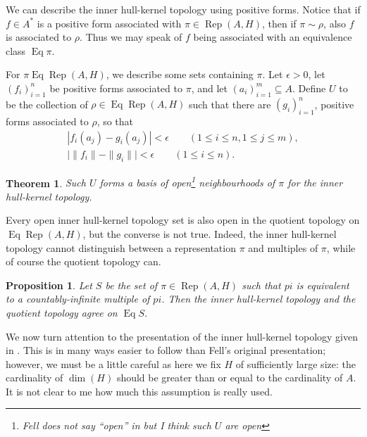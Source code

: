 \documentclass[a4paper,11pt]{article}
\newcommand{\Rep}{\operatorname{Rep}}
\newcommand{\Eq}{\operatorname{Eq}}
\newtheorem{proposition}[lemma]{Proposition}
\newtheorem{theorem}[lemma]{Theorem}
\begin{document}
We can describe the inner hull-kernel topology using positive forms.
Notice that if $f\in A^*$ is a positive form associated with $\pi\in\Rep(A,H)$,
then if $\pi\sim\rho$, also $f$ is associated to $\rho$.  Thus we may speak of
$f$ being associated with an equivalence class $\Eq\pi$.

For $\pi\Eq\Rep(A,H)$, we describe some sets containing $\pi$.  Let $\epsilon>0$,
let $(f_i)_{i=1}^n$ be positive forms associated to $\pi$, and let $(a_i)_{i=1}^m
\subseteq A$.  Define $U$ to be the collection of $\rho\in\Eq\Rep(A,H)$ such that
there are $(g_i)_{i=1}^n$, positive forms associated to $\rho$, so that
\begin{align*}
    | f_i(a_j) - g_i(a_j) | <\epsilon \qquad (1\leq i\leq n, 1\leq j\leq m), \\
    \big| \|f_i\| - \|g_i\| \big| < \epsilon \qquad (1\leq i\leq n).
\end{align*}

\begin{theorem}
Such $U$ forms a basis of open\footnote{Fell does not say ``open'' in \cite{fell2}
but I think such $U$ are open} neighbourhoods of $\pi$ for the inner hull-kernel
topology.
\end{theorem}

Every open inner hull-kernel topology set is also open in the quotient topology
on $\Eq\Rep(A,H)$, but the converse is not true.  Indeed, the inner hull-kernel
topology cannot distinguish between a representation $\pi$ and multiples of
$\pi$, while of course the quotient topology can.

\begin{proposition}
Let $S$ be the set of $\pi\in\Rep(A,H)$ such that $pi$ is equivalent to a
countably-infinite multiple of $pi$.  Then the inner hull-kernel topology
and the quotient topology agree on $\Eq S$.
\end{proposition}

We now turn attention to the presentation of the inner hull-kernel topology
given in \cite[Chapter~5]{kan}.  This is in many ways easier to follow
than Fell's original presentation; however, we must be a little careful as
here we fix $H$ of sufficiently large size: the cardinality of $\dim(H)$ should
be greater than or equal to the cardinality of $A$.  It is not clear to me
how much this assumption is really used.
\end{document}
